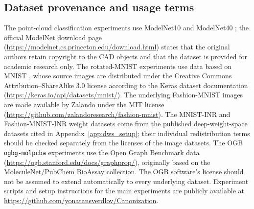 \subsection{Dataset provenance and usage terms}
\label{app:asset_provenance}
The point-cloud classification experiments use ModelNet10 and ModelNet40
\citep{wu20153d}; the official ModelNet download page
(\url{https://modelnet.cs.princeton.edu/download.html}) states that the
original authors retain copyright to the CAD objects and that the
dataset is provided for academic research only.
The rotated-MNIST experiments use data based on MNIST
\citep{larochelle2007empirical}, whose source images are distributed under
the Creative Commons Attribution--ShareAlike 3.0 license according to the
Keras dataset documentation (\url{https://keras.io/api/datasets/mnist/}).
The underlying Fashion-MNIST images are made available by Zalando
under the MIT license
(\url{https://github.com/zalandoresearch/fashion-mnist}).
The MNIST-INR and Fashion-MNIST-INR weight datasets come from the
published deep-weight-space datasets cited in
Appendix~\ref{app:dws_setup}; their individual redistribution terms
should be checked separately from the licenses of the image datasets.
The OGB \texttt{ogbg-molpcba} experiments use the Open Graph Benchmark
data (\url{https://ogb.stanford.edu/docs/graphprop/}), originally based
on the MoleculeNet/PubChem BioAssay collection. The OGB software's
license should not be assumed to extend automatically to every
underlying dataset.
Experiment scripts and setup instructions for the main experiments are
publicly available at \url{https://github.com/yonatansverdlov/Canonization}.
